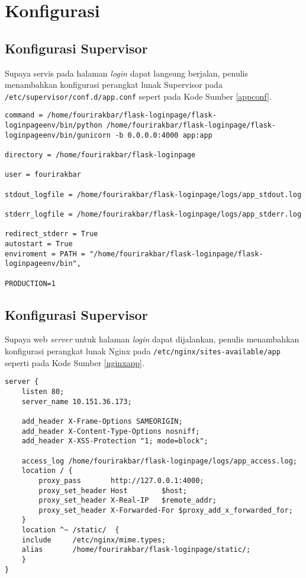\chapter{Konfigurasi}

\section*{Konfigurasi Supervisor}

Supaya servis pada halaman \textit{login} dapat langsung berjalan, penulis menambahkan konfigurasi perangkat lunak Supervisor pada \texttt{/etc/supervisor/conf.d/app.conf} sepert pada Kode Sumber \ref{appconf}. 

\begin{lstlisting}[frame=single,tabsize=2,breaklines,caption={Isi Berkas app.conf},label=appconf, captionpos=b]
command = /home/fourirakbar/flask-loginpage/flask-loginpageenv/bin/python /home/fourirakbar/flask-loginpage/flask-loginpageenv/bin/gunicorn -b 0.0.0.0:4000 app:app

directory = /home/fourirakbar/flask-loginpage

user = fourirakbar

stdout_logfile = /home/fourirakbar/flask-loginpage/logs/app_stdout.log

stderr_logfile = /home/fourirakbar/flask-loginpage/logs/app_stderr.log

redirect_stderr = True
autostart = True
enviroment = PATH = "/home/fourirakbar/flask-loginpage/flask-loginpageenv/bin", 

PRODUCTION=1
\end{lstlisting}

\section*{Konfigurasi Supervisor}

Supaya web \textit{server} untuk halaman \textit{login} dapat dijalankan, penulis menambahkan konfigurasi perangkat lunak Nginx pada \texttt{/etc/nginx/sites-available/app} seperti pada Kode Sumber \ref{nginxapp}.

\begin{lstlisting}[frame=single,tabsize=2,breaklines,caption={Isi Berkas app},label=nginxapp, captionpos=b]
server {
	listen 80;
	server_name 10.151.36.173;
	
	add_header X-Frame-Options SAMEORIGIN;
	add_header X-Content-Type-Options nosniff;
	add_header X-XSS-Protection "1; mode=block";
	
	access_log /home/fourirakbar/flask-loginpage/logs/app_access.log;
	location / {
		proxy_pass       http://127.0.0.1:4000;
		proxy_set_header Host        $host;
		proxy_set_header X-Real-IP   $remote_addr;
		proxy_set_header X-Forwarded-For $proxy_add_x_forwarded_for;
	}
	location ^~ /static/  {
	include     /etc/nginx/mime.types;
	alias       /home/fourirakbar/flask-loginpage/static/;
	}  
}
\end{lstlisting}